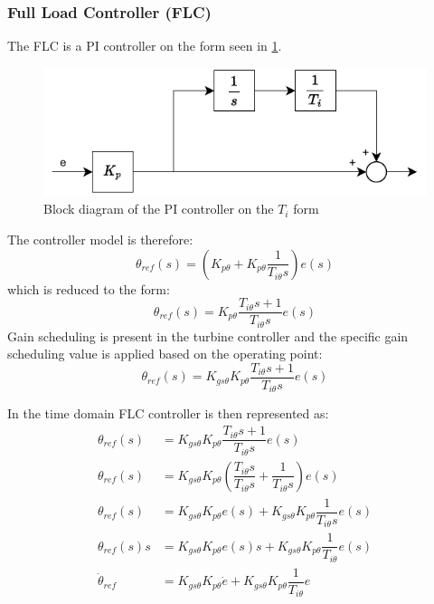 \subsubsection{Full Load Controller (FLC)} \label{sec:mod_wtLin_FLC}
The FLC is a PI controller on the form seen in \cref{fig:PIcontroller}.
\begin{figure}[ht]
	\centering
	\includegraphics[width=0.5\linewidth]{Graphics/PiController.pdf}
	\caption{Block diagram of the PI controller on the \textit{$T_i$} form}
	\label{fig:PIcontroller}
\end{figure}
The controller model is therefore:
\begin{equation}\label{eq:wtlin_comp_flc_1}
	\theta_{ref}(s) = (K_{p \theta} + K_{p \theta} \dfrac{1}{T_{i \theta} s}) e(s)
\end{equation}
which is reduced to the form:
\begin{equation}\label{eq:wtlin_comp_flc_2}
	\theta_{ref}(s) = K_{p \theta}\dfrac{T_{i \theta} s + 1}{T_{i \theta} s} e(s)
\end{equation}
Gain scheduling is present in the turbine controller and the specific gain scheduling value is applied based on the operating point:
\begin{equation}\label{eq:wtlin_comp_flc_3}
	\theta_{ref}(s) = K_{gs \theta} K_{p \theta} \dfrac{T_{i \theta} s + 1}{T_{i \theta} s} e(s)
\end{equation}

In the time domain FLC controller is then represented as:
\begin{align}
	\theta_{ref}(s) & = K_{gs \theta} K_{p \theta} \dfrac{T_{i \theta} s + 1}{T_{i \theta} s} e(s) \\
	\theta_{ref}(s) & = K_{gs \theta} K_{p \theta} (\dfrac{T_{i \theta} s}{T_{i \theta} s} + \dfrac{1}{T_{i \theta} s}) e(s) \\
	\theta_{ref}(s) & = K_{gs \theta} K_{p \theta} e(s) +  K_{gs \theta} K_{p \theta} \dfrac{1}{T_{i \theta} s}e(s) \\
	\theta_{ref}(s) s & = K_{gs \theta} K_{p \theta} e(s) s +  K_{gs \theta} K_{p \theta} \dfrac{1}{T_{i \theta}}e(s) \\
	\dot{\theta}_{ref} & = K_{gs \theta} K_{p \theta} \dot{e} +  K_{gs \theta} K_{p \theta} \dfrac{1}{T_{i \theta}}e
\end{align}



